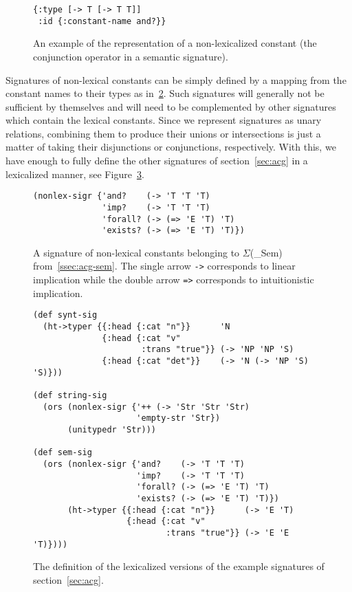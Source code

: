 \begin{figure}
  \centering
\begin{verbatim}
{:type [-> T [-> T T]]
 :id {:constant-name and?}}
\end{verbatim}
  \caption{\label{fig:nonlex-const} An example of the representation of
    a non-lexicalized constant (the conjunction operator in a semantic
    signature).}
\end{figure}

Signatures of non-lexical constants can be simply defined by a mapping
from the constant names to their types as
in~\ref{fig:nonlex-sig-impl}. Such signatures will generally not be
sufficient by themselves and will need to be complemented by other
signatures which contain the lexical constants. Since we represent
signatures as unary relations, combining them to produce their unions or
intersections is just a matter of taking their disjunctions or
conjunctions, respectively. With this, we have enough to fully define
the other signatures of section~\ref{sec:acg} in a lexicalized
manner, see Figure~\ref{fig:example-sig-impl}.

\begin{figure}
  \centering
\begin{verbatim}
(nonlex-sigr {'and?    (-> 'T 'T 'T)
              'imp?    (-> 'T 'T 'T)
              'forall? (-> (=> 'E 'T) 'T)
              'exists? (-> (=> 'E 'T) 'T)})
\end{verbatim}
  \caption{\label{fig:nonlex-sig-impl} A signature of non-lexical
    constants belonging to $\Sigma$(\_{Sem})
    from~\ref{ssec:acg-sem}. The single arrow \texttt{->} corresponds
    to linear implication while the double arrow \texttt{=>} corresponds
    to intuitionistic implication.}
\end{figure}

\begin{figure}
  \centering
\begin{verbatim}
(def synt-sig
  (ht->typer {{:head {:cat "n"}}      'N
              {:head {:cat "v"
                      :trans "true"}} (-> 'NP 'NP 'S)
              {:head {:cat "det"}}    (-> 'N (-> 'NP 'S) 'S)}))

(def string-sig
  (ors (nonlex-sigr {'++ (-> 'Str 'Str 'Str)
                     'empty-str 'Str})
       (unitypedr 'Str)))

(def sem-sig
  (ors (nonlex-sigr {'and?    (-> 'T 'T 'T)
                     'imp?    (-> 'T 'T 'T)
                     'forall? (-> (=> 'E 'T) 'T)
                     'exists? (-> (=> 'E 'T) 'T)})
       (ht->typer {{:head {:cat "n"}}      (-> 'E 'T)
                   {:head {:cat "v"
                           :trans "true"}} (-> 'E 'E 'T)})))
\end{verbatim}
  \caption{\label{fig:example-sig-impl} The definition of the
    lexicalized versions of the example signatures of
    section~\ref{sec:acg}.}
\end{figure}

